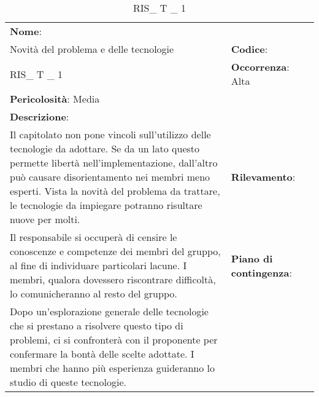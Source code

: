 \renewcommand{\arraystretch}{1.5}
\begin{longtable} { 
		>{\raggedright}p{} 
		>{\raggedright}p{} 
		>{\raggedright}p{}    }
		
		\caption{RIS\_ T \_ 1} \endhead	


	\textbf{Nome}: \\ Novità del problema e delle tecnologie
	& \textbf{Codice}: \\ RIS\_ T \_ 1  
	& \textbf{Occorrenza}: Alta \\ \textbf{Pericolosità}: Media
	
	\tabularnewline
	
	\textbf{Descrizione}: \\ Il capitolato non pone vincoli sull'utilizzo delle tecnologie da adottare. Se da un lato questo permette libertà nell'implementazione, dall'altro può causare disorientamento nei membri meno esperti. Vista la novità del problema da trattare, le tecnologie da impiegare potranno risultare nuove per molti.
	& 
	\textbf{Rilevamento}: \\ Il responsabile si occuperà di censire le conoscenze e competenze dei membri del gruppo, al fine di individuare particolari lacune. I membri, qualora dovessero riscontrare difficoltà, lo comunicheranno al resto del gruppo. 	
	&  
	\textbf{Piano di contingenza}: \\ Dopo un'esplorazione generale delle tecnologie che si prestano a risolvere questo tipo di problemi, ci si confronterà con il proponente per confermare la bontà delle scelte adottate. I membri che hanno più esperienza guideranno lo studio di queste tecnologie.

\end{longtable}


